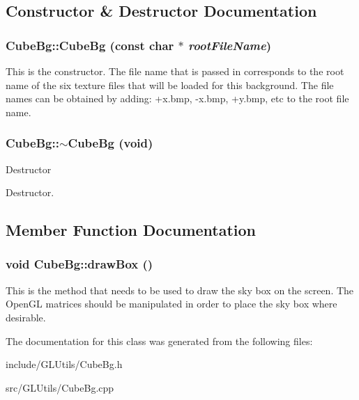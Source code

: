 \subsection{Constructor \& Destructor Documentation}
\hypertarget{classCartWheel_1_1GL_1_1CubeBg_af8c13ad03f8894416ed5b7ebe01f3a63}{
\subsubsection[{CubeBg}]{\setlength{\rightskip}{0pt plus 5cm}CubeBg::CubeBg (const char $\ast$ {\em rootFileName})}}
\label{classCartWheel_1_1GL_1_1CubeBg_af8c13ad03f8894416ed5b7ebe01f3a63}
This is the constructor. The file name that is passed in corresponds to the root name of the six texture files that will be loaded for this background. The file names can be obtained by adding: +x.bmp, -\/x.bmp, +y.bmp, etc to the root file name. \hypertarget{classCartWheel_1_1GL_1_1CubeBg_a91ad0f4ba08c14b0c2acb98196c56f92}{
\subsubsection[{$\sim$CubeBg}]{\setlength{\rightskip}{0pt plus 5cm}CubeBg::$\sim$CubeBg (void)}}
\label{classCartWheel_1_1GL_1_1CubeBg_a91ad0f4ba08c14b0c2acb98196c56f92}
Destructor

Destructor. 

\subsection{Member Function Documentation}
\hypertarget{classCartWheel_1_1GL_1_1CubeBg_ae4fa42c93d7e5f4d8cb69218146536e2}{
\subsubsection[{drawBox}]{\setlength{\rightskip}{0pt plus 5cm}void CubeBg::drawBox ()}}
\label{classCartWheel_1_1GL_1_1CubeBg_ae4fa42c93d7e5f4d8cb69218146536e2}
This is the method that needs to be used to draw the sky box on the screen. The OpenGL matrices should be manipulated in order to place the sky box where desirable. 

The documentation for this class was generated from the following files:\begin{DoxyCompactItemize}
\item 
include/GLUtils/CubeBg.h\item 
src/GLUtils/CubeBg.cpp\end{DoxyCompactItemize}
